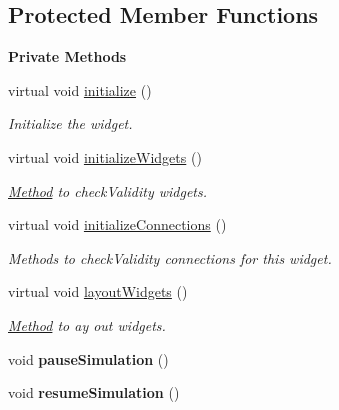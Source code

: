 \subsection*{Protected Member Functions}
\begin{Indent}\textbf{ Private Methods}\par
\begin{DoxyCompactItemize}
\item 
\mbox{\label{classrev_1_1_view_1_1_parameter_widget_a67cfc0a313291171d41199c5c9c575a9}} 
virtual void \mbox{\hyperlink{classrev_1_1_view_1_1_parameter_widget_a67cfc0a313291171d41199c5c9c575a9}{initialize}} ()
\begin{DoxyCompactList}\small\item\em Initialize the widget. \end{DoxyCompactList}\item 
\mbox{\label{classrev_1_1_view_1_1_parameter_widget_ac3dba92861c7236c55d73be1d4efeea6}} 
virtual void \mbox{\hyperlink{classrev_1_1_view_1_1_parameter_widget_ac3dba92861c7236c55d73be1d4efeea6}{initialize\+Widgets}} ()
\begin{DoxyCompactList}\small\item\em \mbox{\hyperlink{struct_method}{Method}} to check\+Validity widgets. \end{DoxyCompactList}\item 
\mbox{\label{classrev_1_1_view_1_1_parameter_widget_a5eadb80f225d1caae4fbe0327d060920}} 
virtual void \mbox{\hyperlink{classrev_1_1_view_1_1_parameter_widget_a5eadb80f225d1caae4fbe0327d060920}{initialize\+Connections}} ()
\begin{DoxyCompactList}\small\item\em Methods to check\+Validity connections for this widget. \end{DoxyCompactList}\item 
\mbox{\label{classrev_1_1_view_1_1_parameter_widget_ab5c8f0bc4977103e5c6d519fc7ffaa4c}} 
virtual void \mbox{\hyperlink{classrev_1_1_view_1_1_parameter_widget_ab5c8f0bc4977103e5c6d519fc7ffaa4c}{layout\+Widgets}} ()
\begin{DoxyCompactList}\small\item\em \mbox{\hyperlink{struct_method}{Method}} to ay out widgets. \end{DoxyCompactList}\item 
\mbox{\label{classrev_1_1_view_1_1_parameter_widget_a57f7853b45578779b29262b26cb7d44a}} 
void {\bfseries pause\+Simulation} ()
\item 
\mbox{\label{classrev_1_1_view_1_1_parameter_widget_ad8205cc8723239bb023983969beaf1ad}} 
void {\bfseries resume\+Simulation} ()
\end{DoxyCompactItemize}
\end{Indent}
